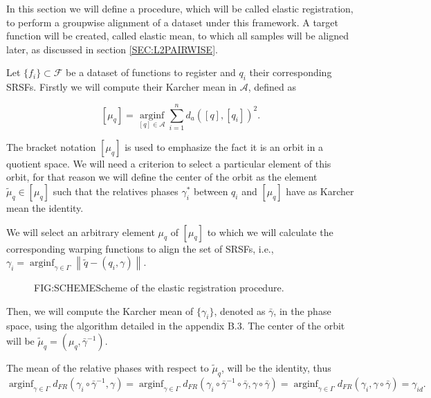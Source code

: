 
In this section we will define a procedure, which will be called elastic
registration, to perform a groupwise alignment of a dataset under this
framework. A target function will be created, called elastic mean, to which all
samples will be aligned later, as discussed in section \ref{SEC:L2PAIRWISE}.

Let $\{f_i\} \subset \mathscr{F}$ be a dataset of functions to register and
$q_i$ their corresponding SRSFs. Firstly we will compute their Karcher mean in
$\mathscr{A}$, defined as

$$
\left[\mu_{q}\right]=\underset{[q] \in \mathscr{A}}{\operatorname{arginf}}
\sum_{i=1}^{n} d_{a}\left([q],\left[q_{i}\right]\right)^{2}.
$$

The bracket notation $[\mu_{q}]$ is used to emphasize the fact it is an orbit in
a quotient space. We will need a criterion to select a particular element of
this orbit, for that reason we will define the center of the orbit as the
element $\tilde \mu_{q}  \in [\mu_{q}]$  such that the relatives phases
${\gamma_i^*}$ between ${q_i}$ and $[\mu_{q}]$ have as Karcher mean the identity.

We will select an arbitrary element $\mu_{q}$ of $[\mu_{q}]$ to which we will
calculate the corresponding warping functions to align the set of SRSFs, i.e.,
$\gamma_{i}=\operatorname{arginf}_{\gamma \in \Gamma}\left\|\tilde{q}-
\left(q_{i}, \gamma\right)\right\|$.

\begin{figure}[Scheme of the elastic registration procedure]{FIG:SCHEME}{Scheme of the elastic registration procedure.}
\end{figure}

Then, we will compute the Karcher mean of $\{\gamma_i\}$, denoted as
$\bar \gamma$, in the phase space, using the algorithm detailed in the
appendix B.3. The center of the orbit will be
$\tilde \mu_q = (\mu_q , {\bar \gamma}^{-1})$.

The mean of the relative phases with respect to $\tilde \mu_q$, will be the
identity, thus \\
$
\operatorname{arginf}_{\gamma \in \Gamma}d_{FR}(\gamma_i \circ {\bar \gamma}^{-1}, \gamma) =
\operatorname{arginf}_{\gamma \in \Gamma}d_{FR}(\gamma_i \circ {\bar \gamma}^{-1} \circ \bar \gamma, \gamma \circ \bar \gamma) =
\operatorname{arginf}_{\gamma \in \Gamma}d_{FR}(\gamma_i, \gamma \circ \bar \gamma) = \gamma_{id}.
$

